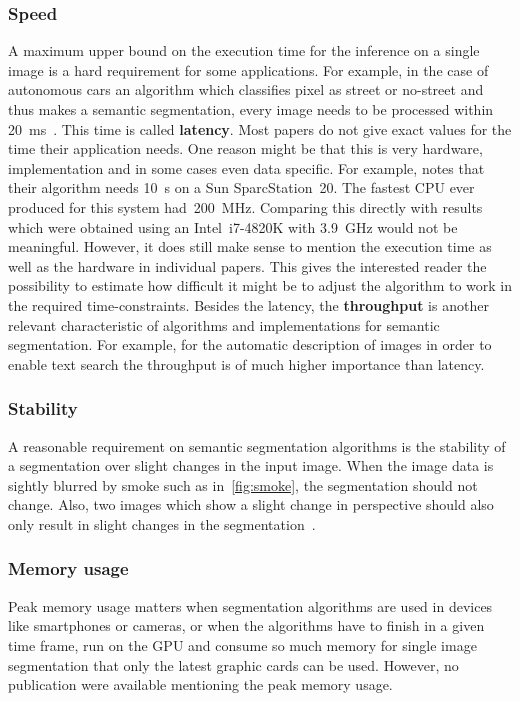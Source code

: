 \documentclass[technote,a4paper,leqno]{IEEEtran}
\begin{document}
\subsubsection{Speed}%
\label{subsubsec:speed-quality-measure}%
A maximum upper bound on the execution time for the inference on a single image
is a hard requirement for some applications. For example, in the case of
autonomous cars an algorithm which classifies pixel as street or no-street
and thus makes a semantic segmentation, every image needs to be processed
within \SI{20}{\milli\second}~\cite{bittel2015pixel}. This time is called
\textbf{latency}.
Most papers do not give exact values for the time their application needs. One
reason might be that this is very hardware, implementation and in some cases
even data specific. For example, \cite{hoover1996experimental} notes that their
algorithm needs \SI{10}{\second} on a Sun SparcStation~20. The fastest CPU ever
produced for this system had~\SI{200}{\mega\hertz}. Comparing this directly
with results which were obtained using an Intel~i7-4820K with
\SI{3.9}{\giga\hertz} would not be meaningful.
However, it does still make sense to mention the execution time as well as the
hardware in individual papers. This gives the interested reader the possibility
to estimate how difficult it might be to adjust the algorithm to work in the
required time-constraints.
Besides the latency, the \textbf{throughput} is another relevant characteristic
of algorithms and implementations for semantic segmentation. For example, for
the automatic description of images in order to enable text search the
throughput is of much higher importance than latency.
\subsubsection{Stability}%
\label{subsubsec:stability-quality-measure}%
A reasonable requirement on semantic segmentation algorithms is the stability
of a segmentation over slight changes in the input image. When the image data
is sightly blurred by smoke such as in~\cref{fig:smoke}, the segmentation
should not change. Also, two images which show a slight change in perspective
should also only result in slight changes in the
segmentation~\cite{pantofaru2005comparison}.
\subsubsection{Memory usage}
Peak memory usage matters when segmentation algorithms are used in devices like
smartphones or cameras, or when the algorithms have to finish in a given time
frame, run on the \gls{GPU} and consume so much memory for single image
segmentation that only the latest graphic cards can be used. However, no
publication were available mentioning the peak memory usage.
\end{document}
